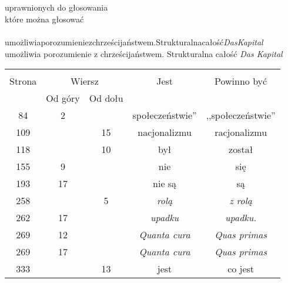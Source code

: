 \documentclass[a4paper,11pt]{article}
\begin{document}
\noindent \\
 \\
\Jest  uprawnionych do głosowania \\
\Powin które można głosować \\
 \\
\Jest  umożliwiaporozumieniezchrześcijaństwem.Strukturalnacałość\emph{DasKapital}
\\
\Powin umożliwia porozumienie z chrześcijaństwem. Strukturalna całość
\emph{Das Kapital} \\

\vspace{\spaceTwo}







\begin{center}
  \begin{tabular}{|c|c|c|c|c|}
    \hline
    & \multicolumn{2}{c|}{} & & \\
    Strona & \multicolumn{2}{c|}{Wiersz} & Jest
                              & Powinno być \\ \cline{2-3}
    & Od góry & Od dołu & & \\
    \hline
    84  &  2 & & społeczeństwie'' & ,,społeczeństwie'' \\
    109 & & 15 & nacjonalizmu & racjonalizmu \\
    118 & & 10 & był & został \\
    155 &  9 & & nie & się \\
    193 & 17 & & nie są & są \\
    258 & &  5 & \emph{rolą} & \emph{z rolą} \\
    262 & 17 & & \emph{upadku} & \emph{upadku.} \\
    269 & 12 & & \emph{Quanta cura} & \emph{Quas primas} \\
    269 & 17 & & \emph{Quanta cura} & \emph{Quas primas} \\
    333 & & 13 & jest & co jest \\
    \hline
  \end{tabular}
\end{center}

\vspace{\spaceTwo}
\end{document}
